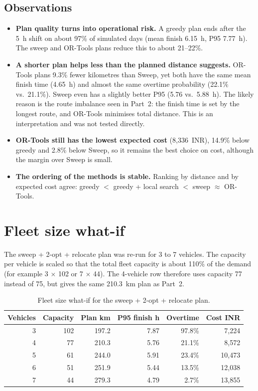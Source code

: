 \documentclass[11pt,a4paper]{article}
\begin{document}
\subsection*{Observations}
\begin{itemize}
  \item \textbf{Plan quality turns into operational risk.} A greedy plan ends after the 5~h shift on about
        97\% of simulated days (mean finish 6.15~h, P95 7.77~h). The sweep and OR-Tools plans reduce this to
        about 21--22\%.
  \item \textbf{A shorter plan helps less than the planned distance suggests.} OR-Tools plans 9.3\% fewer
        kilometres than Sweep, yet both have the same mean finish time (4.65~h) and almost the same overtime
        probability (22.1\% vs.\ 21.1\%). Sweep even has a slightly better P95 (5.76 vs.\ 5.88~h). The likely
        reason is the route imbalance seen in Part~2: the finish time is set by the longest route, and
        OR-Tools minimises total distance. This is an interpretation and was not tested directly.
  \item \textbf{OR-Tools still has the lowest expected cost} (8,336~INR), 14.9\% below greedy and 2.8\% below
        Sweep, so it remains the best choice on cost, although the margin over Sweep is small.
  \item \textbf{The ordering of the methods is stable.} Ranking by distance and by expected cost agree:
        greedy $<$ greedy + local search $<$ sweep $\approx$ OR-Tools.
\end{itemize}

\section{Fleet size what-if}

The sweep + 2-opt + relocate plan was re-run for 3 to 7 vehicles. The capacity per vehicle is scaled so that
the total fleet capacity is about 110\% of the demand (for example 3 $\times$ 102 or 7 $\times$ 44). The
4-vehicle row therefore uses capacity 77 instead of 75, but gives the same 210.3~km plan as Part~2.

\begin{table}[H]
\centering
\begin{tabular}{rrrrrr}
\toprule
Vehicles & Capacity & Plan km & P95 finish h & Overtime & Cost INR \\
\midrule
3 & 102 & 197.2 & 7.87 & 97.8\% &  7,224 \\
4 &  77 & 210.3 & 5.76 & 21.1\% &  8,572 \\
5 &  61 & 244.0 & 5.91 & 23.4\% & 10,473 \\
6 &  51 & 251.9 & 5.44 & 13.5\% & 12,038 \\
7 &  44 & 279.3 & 4.79 &  2.7\% & 13,855 \\
\bottomrule
\end{tabular}
\caption{Fleet size what-if for the sweep + 2-opt + relocate plan.}
\label{tab:fleet}
\end{table}
\end{document}
